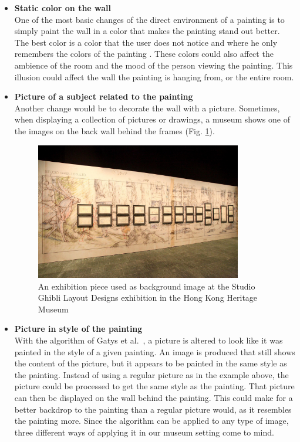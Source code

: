 \documentclass[a4paper]{article}
\begin{document}
\begin{itemize}

\item{\textbf{Static color on the wall}} %
\\One of the most basic changes of the direct environment of a painting is to simply paint the wall in a color that makes the painting stand out better. The best color is a color that the user does not notice and where he only remembers the colors of the painting \cite{colorwall}. These colors could also affect the ambience of the room and the mood of the person \cite{mood} viewing the painting. This illusion could affect the wall the painting is hanging from, or the entire room.

\item{\textbf{Picture of a subject related to the painting}} 
\\Another change would be to decorate the wall with a picture. Sometimes, when displaying a collection of pictures or drawings, a museum shows one of the images on the back wall behind the frames (Fig. \ref{fig:picturewall}).

\begin{figure}[h!]
\centering
\includegraphics[width = 90mm]{PictureWall.jpg}
\caption{An exhibition piece used as background image at the Studio Ghibli Layout Designs exhibition in the Hong Kong Heritage Museum \cite{ghibli}}
\label{fig:picturewall} %
\end{figure}

\item{\textbf{Picture in style of the painting}}
\\With the algorithm of Gatys et al.~\cite{gatys}, a picture is altered to look like it was painted in the style of a given painting. An image is produced that still shows the content of the picture, but it appears to be painted in the same style as the painting. Instead of using a regular picture as in the example above, the picture could be processed to get the same style as the painting. That picture can then be displayed on the wall behind the painting. This could make for a better backdrop to the painting than a regular picture would, as it resembles the painting more. Since the algorithm can be applied to any type of image, three different ways of applying it in our museum setting come to mind. 


\end{itemize}
\end{document}
